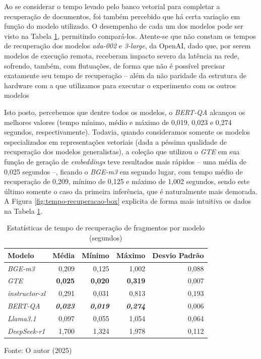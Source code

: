 Ao se considerar o tempo levado pelo banco vetorial para completar a recuperação de documentos, foi também percebido que há certa variação em função do modelo utilizado. O desempenho de cada um dos modelos pode ser visto na Tabela \ref{tab:tempo-recuperacao}, permitindo compará-los. Atente-se que não constam os tempos de recuperação dos modelos \textit{ada-002} e \textit{3-large}, da OpenAI, dado que, por serem modelos de execução remota, receberam impacto severo da latência na rede, sofrendo, também, com flutuações, de forma que não é possível precisar exatamente seu tempo de recuperação -- além da não paridade da estrutura de hardware com a que utilizamos para executar o experimento com os outros modelos

Isto posto, percebemos que dentre todos os modelos, o \textit{BERT-QA} alcançou os melhores valores (tempo mínimo, médio e máximo de 0,019, 0,023 e 0,274 segundos, respectivamente). Todavia, quando consideramos somente os modelos especializados em representações vetoriais (dada a péssima qualidade de recuperação dos modelos generalistas), a coleção que utilizou o \textit{GTE} em sua função de geração de \textit{embeddings} teve resultados mais rápidos -- uma média de 0,025 segundos --, ficando o \textit{BGE-m3} em segundo lugar, com tempo médio de recuperação de 0,209, mínimo de 0,125 e máximo de 1,002 segundos, sendo este último somente o caso da primeira inferência, que é naturalmente mais demorada.
A Figura \ref{fig:tempo-recuperacao-box} explicita de forma mais intuitiva os dados na Tabela \ref{tab:tempo-recuperacao}.

\begin{table}[H]
    \caption{Estatísticas de tempo de recuperação de fragmentos por modelo (segundos)}
    \centering
    \begin{tabular}{ l r r r r }
        \hline
        \textbf{Modelo} & \textbf{Média} & \textbf{Mínimo} & \textbf{Máximo} & \textbf{Desvio Padrão} \\
        \hline
        \textit{BGE-m3} & 0,209 & 0,125 & 1,002 & 0,088 \\
        \textit{GTE} & \textbf{0,025} & \textbf{0,020} & \textbf{0,319} & 0,007 \\
        \textit{instructor-xl} & 0,291 & 0,031 & 0,813 & 0,193 \\
        \textit{BERT-QA} & \textbf{\textit{0,023}} & \textbf{\textit{0,019}} & \textbf{\textit{0,274}} & 0,006 \\
        \textit{Llama3.1} & 0,097 & 0,055 & 1,054 & 0,064 \\
        \textit{DeepSeek-r1} & 1,700 & 1,324 & 1,978 & 0,112 \\
    \hline
    \end{tabular}
    
    Fonte: O autor (2025)
    \label{tab:tempo-recuperacao}
\end{table}

